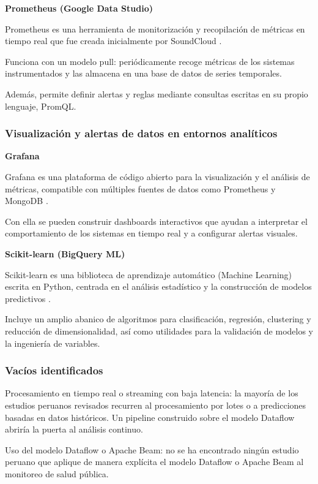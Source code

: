 \documentclass[12pt,a4paper]{article}
\begin{document}
\textbf{Prometheus (Google Data Studio)}

Prometheus es una herramienta de monitorización y recopilación de métricas en tiempo real que fue creada inicialmente por SoundCloud \parencite{prometheus2024doc}.

Funciona con un modelo pull: periódicamente recoge métricas de los sistemas instrumentados y las almacena en una base de datos de series temporales.

Además, permite definir alertas y reglas mediante consultas escritas en su propio lenguaje, PromQL.

\subsubsection{Visualización y alertas de datos en entornos analíticos}

\textbf{Grafana}

Grafana es una plataforma de código abierto para la visualización y el análisis de métricas, compatible con múltiples fuentes de datos como Prometheus y MongoDB \parencite{grafana2024doc}.

Con ella se pueden construir dashboards interactivos que ayudan a interpretar el comportamiento de los sistemas en tiempo real y a configurar alertas visuales.

\textbf{Scikit-learn (BigQuery ML)}

Scikit-learn es una biblioteca de aprendizaje automático (Machine Learning) escrita en Python, centrada en el análisis estadístico y la construcción de modelos predictivos \parencite{pedregosa2011scikit}.

Incluye un amplio abanico de algoritmos para clasificación, regresión, clustering y reducción de dimensionalidad, así como utilidades para la validación de modelos y la ingeniería de variables.

\subsubsection{Vacíos identificados}\label{vacuxedos-identificados}

Procesamiento en tiempo real o streaming con baja latencia: la mayoría de los estudios peruanos revisados recurren al procesamiento por lotes o a predicciones basadas en datos históricos. Un pipeline construido sobre el modelo Dataflow abriría la puerta al análisis continuo.

Uso del modelo Dataflow o Apache Beam: no se ha encontrado ningún estudio peruano que aplique de manera explícita el modelo Dataflow o Apache Beam al monitoreo de salud pública.
\end{document}
